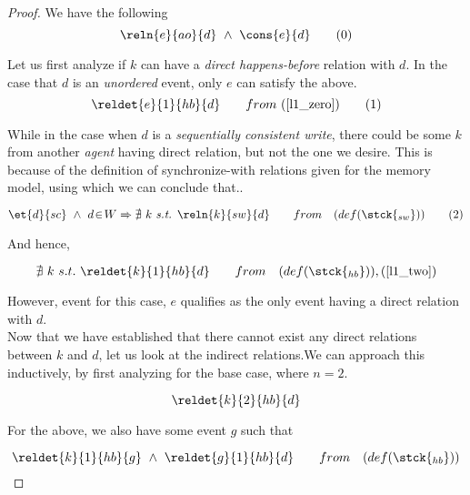  \begin{proof}
       
        We have the following
        \[
            \reln{e}{ao}{d} \ \wedge \ \cons{e}{d} 
            \tag{0}
            \label{l1_zero}
        \]
       
       
        Let us first analyze if $k$ can have a \textit{direct happens-before} relation with $d$. In the case that $d$ is an \textit{unordered} event, only $e$ can satisfy the above. 
            \[
                \reldet{e}{1}{hb}{d} \qquad 
                from \  
                (\ref{l1_zero})
                \tag{1}
                \label{l1_one}
            \]
        
        While in the case when $d$ is a \textit{sequentially consistent write}, there could be some $k$ from another \textit{agent} having direct relation, but not the one we desire. This is because of the definition of synchronize-with relations given for the memory model, using which we can conclude that.. 
        
        \[
            \et{d}{sc} \ \wedge \ d \!\in \! W \Rightarrow 
            \nexists \ k \ \textit{s.t. }
            \reln{k}{sw}{d} \qquad
            from \quad
            (def(\stck{_{sw}}))
            \tag{2}
            \label{l1_two}
        \]
        
        And hence, 
        
        \[
            \nexists \ k \ s.t. \
            \reldet{k}{1}{hb}{d} \qquad
            from \quad 
            (def(\stck{_{hb}})),
            (\ref{l1_two})
        \]
        
        However, event for this case, $e$ qualifies as the only event having a direct relation with $d$. \\
        
        Now that we have established that there cannot exist any direct relations between $k$ and $d$, let us look at the indirect relations.We can approach this inductively, by first analyzing for the base case, where $n=2$.
        
        \[
            \reldet{k}{2}{hb}{d}
        \]
        
        For the above, we also have some event $g$ such that
        
        \[
            \reldet{k}{1}{hb}{g} \ \wedge \ 
            \reldet{g}{1}{hb}{d} \qquad
            from \quad 
            (def(\stck{_{hb}}))
        \]
        

\end{proof}
